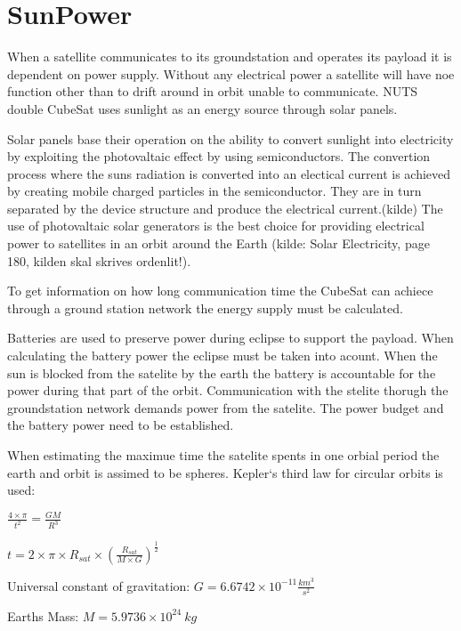 \section{SunPower}

When a satellite communicates to its groundstation and operates its payload it is dependent on power supply. Without any electrical power a satellite will have noe function other than to drift around in orbit unable to communicate. NUTS double CubeSat uses sunlight as an energy source through solar panels. 

Solar panels base their operation on the ability to convert sunlight into electricity by exploiting the photovaltaic effect by using semiconductors. The convertion process where the suns radiation is converted into an electical current is achieved by creating mobile charged particles in the semiconductor. They are in turn separated by the device structure and produce the electrical current.(kilde) The use of photovaltaic solar generators is the best choice for providing electrical power to satellites in an orbit around the Earth (kilde: Solar Electricity, page 180, kilden skal skrives ordenlit!).

To get information on how long communication time the CubeSat can achiece through a ground station network the energy supply must be calculated.

Batteries are used to preserve power during eclipse to support the payload. When calculating the battery power the eclipse must be taken into acount. When the sun is blocked from the satelite by the earth the battery is accountable for the power during that part of the orbit. Communication with the stelite thorugh the groundstation network demands power from the satelite. The power budget and the battery power need to be established.

\vspace{5 mm} When estimating the maximue time the satelite spents in one orbial period the earth and orbit is assimed to be spheres. Kepler`s third law for circular orbits is used:

\vspace{5 mm}$\frac{4\times\pi}{t^2} = \frac{GM}{R^3}$

$t = 2\times\pi\times R_{sat}\times (\frac{R_{sat}}{M\times G})^{\frac{1}{2}}$

\vspace{5 mm}Universal constant of gravitation: $G = 6.6742\times 10^{-11} \frac{km^3}{s^2}$

Earths Mass: $M = 5.9736\times 10^{24}\ kg$

